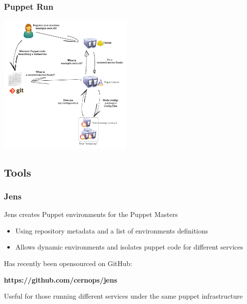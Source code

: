 \documentclass[aspectratio=169]{beamer}
\begin{document}

\begin{frame}
    \frametitle{Puppet Run}
    \vspace{-1em}
    \begin{center}
        \includegraphics[width=0.5\textwidth]{puppetrun3.png}
    \end{center}
\end{frame}


\subsection{Tools}
\begin{frame}
    \frametitle{Jens}
    Jens creates Puppet environments for the Puppet Masters
    \begin{itemize}
        \item Using repository metadata and a list of environments definitions
        \item Allows dynamic environments and isolates puppet code 
            for different services
    \end{itemize}
    \vspace{2em}
    Has recently been opensourced on GitHub: \\
    \vspace{1em}
    \begin{center}
        \textbf{https://github.com/cernops/jens} \\
    \end{center}
    \vspace{1em}
    Useful for those running different services under the 
    same puppet infrastructure
\end{frame}
\end{document}
